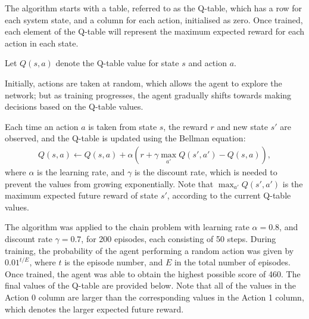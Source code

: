 The algorithm starts with a table, referred to as the Q-table, which has a row
for each system state, and a column for each action, initialised as zero.
Once trained, each element of the Q-table will represent the maximum expected
reward for each action in each state.

Let $Q(s,a)$ denote the Q-table value for state $s$ and action $a$.

Initially, actions are taken at random, which allows the agent to explore the
network; but as training progresses, the agent gradually shifts towards making
decisions based on the Q-table values.

Each time an action $a$ is taken from state $s$, the reward $r$ and new state
$s'$ are observed, and the Q-table is updated using the Bellman equation:
\begin{align}
    Q(s,a) \leftarrow Q(s,a) + \alpha (r + \gamma\max_{a'}Q(s',a') - Q(s,a)),
    \label{eq:RL:QL}
\end{align}
where $\alpha$ is the learning rate, and $\gamma$ is the discount rate, which is
needed to prevent the values from growing exponentially.
Note that $\max_{a'}Q(s',a')$ is the maximum expected future reward of state
$s'$, according to the current Q-table values.

The algorithm was applied to the chain problem with learning rate $\alpha =
0.8$, and discount rate $\gamma = 0.7$, for 200 episodes, each consisting of 50
steps.
During training, the probability of the agent performing a random action was
given by $0.01^{t/E}$, where $t$ is the episode number, and $E$ in the total
number of episodes.
Once trained, the agent was able to obtain the highest possible score of 460.
The final values of the Q-table are provided below.
Note that all of the values in the Action 0 column are larger than the
corresponding values in the Action 1 column, which denotes the larger expected
future reward.



